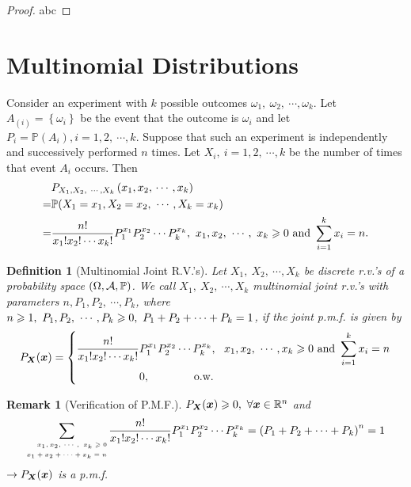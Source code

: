 \documentclass[openany,12pt]{book}
\newtheorem{remark}{Remark}[chapter]
\newtheorem{definition}{Definition}[chapter]
\begin{document}
\begin{proof}
  abc
\end{proof}

\section{Multinomial Distributions}

Consider an experiment with $k$ possible outcomes $\omega_{1},\ \omega_{2},\ \cdots,\omega_{k}$. Let $A_{\left( i \right)} = \left\{ \omega_{i} \right\}$ be the event that the outcome is $\omega_{i}$ and let $P_{i} = \mathbb{P}(A_{i}),i = 1,2,\ \cdots,k.$ Suppose that such an experiment is independently and successively performed $n$ times. Let $X_{i},\ i = 1,2,\ \cdots,k$ be the number of times that event $A_{i}$ occurs. Then
\[\begin{aligned}
&P_{X_{1},X_{2},\ \cdots,X_{k}}\left( x_{1},x_{2},\, \cdots,x_{k} \right) \\
=& \mathbb{P}( X_{1} = x_{1},X_{2} = x_{2},\ \cdots,X_{k} = x_{k} )\\
=& \frac{n!}{x_{1}!x_{2}!\cdots x_{k}!}P_{1}^{x_{1}}P_{2}^{x_{2}}\cdots P_{k}^{x_{k}},\ x_{1},x_{2},\ \cdots,\ x_{k} \gs 0\ \mathrm{\text{and}}\ \sum_{i=1}^k x_i=n.
\end{aligned}\]

\begin{definition}[Multinomial Joint R.V.'s]
Let $X_{1},\ X_{2},\ \cdots,X_{k}$ be discrete r.v.'s of a probability space $(\Omega,\mathcal{A},\mathbb{P})$. We call $X_{1},\ X_{2},\ \cdots,X_{k}$ multinomial joint r.v.'s with parameters $n,P_{1},P_{2},\ \cdots,P_{k}$, where $n \geqslant 1,\ P_{1},P_{2},\ \cdots,P_{k} \geqslant 0,\ P_{1} + P_{2} + \cdots + P_{k} = 1$, if the joint p.m.f. is given by
\[P_{\mX}(\mx) = \left\{ \begin{aligned}
\frac{n!}{x_{1}!x_{2}!\cdots x_{k}!} & P_{1}^{x_{1}}P_{2}^{x_{2}}\cdots P_{k}^{x_{k}},\ \mathrm{\ }x_{1},x_{2},\ \cdots,x_{k} \gs 0\ \mathrm{\text{and}}\ \sum_{i=1}^k x_i=n \\
&0, \qquad\qquad\mathrm{\text{o.w.}}\\
\end{aligned} \right.\]
\end{definition}

\begin{remark}[Verification of P.M.F.]
$P_{\bm{X}}(\bm{x}) \geqslant 0,\ \forall\bm{x} \in \mathbb{R}^{n}$ and
\[\sum_{\mbox{\tiny$\begin{aligned}
x_{1},x_{2},\,\cdots,\ x_{k} \geqslant 0 \\
x_{1} + x_{2} + \cdots + x_{k} = n \\
\end{aligned}$}}^{}{\frac{n!}{x_{1}!x_{2}!\cdots x_{k}!}P_{1}^{x_{1}}P_{2}^{x_{2}}\cdots P_{k}^{x_{k}}} = \left( P_{1} + P_{2} + \cdots + P_{k} \right)^{n} = 1\]
$\to P_{\bm{X}}(\bm{x})$ is a p.m.f.
\end{remark}
\end{document}
